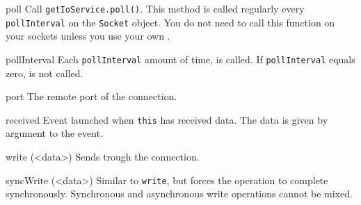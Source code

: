 \begin{urbiscriptapi}
\item[poll]
  Call \lstinline|getIoService.poll()|. This method is called regularly every
  \lstinline|pollInterval| on the \lstinline|Socket| object. You do not need
  to call this function on your sockets unless you use your own
  .

\item[pollInterval]
  Each \lstinline|pollInterval| amount of time, 
  is called. If \lstinline|pollInterval| equals zero,
   is not called.

\item[port]
  The remote port of the connection.

\item[received]
  Event launched when \lstinline|this| has received data. The data is
  given by argument to the event.

\item[write](<data>)%
  Sends  trough the connection.

\item[syncWrite](<data>)%
  Similar to \lstinline|write|, but forces the operation to complete
  synchronously. Synchronous and asynchronous write operations cannot be mixed.

\end{urbiscriptapi}

